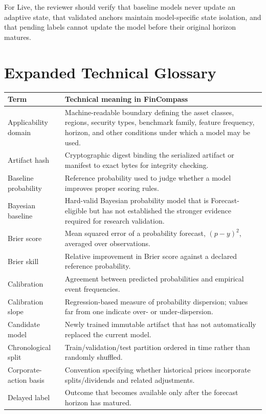 \documentclass[11pt]{article}
\begin{document}
For Live, the reviewer should verify that baseline models never update an adaptive state, that validated anchors maintain model-specific state isolation, and that pending labels cannot update the model before their original horizon matures.

\section{Expanded Technical Glossary}
\begin{longtable}{p{}p{}}
\toprule
Term & Technical meaning in FinCompass\\
\midrule
Applicability domain & Machine-readable boundary defining the asset classes, regions, security types, benchmark family, feature frequency, horizon, and other conditions under which a model may be used.\\
Artifact hash & Cryptographic digest binding the serialized artifact or manifest to exact bytes for integrity checking.\\
Baseline probability & Reference probability used to judge whether a model improves proper scoring rules.\\
Bayesian baseline & Hard-valid Bayesian probability model that is Forecast-eligible but has not established the stronger evidence required for research validation.\\
Brier score & Mean squared error of a probability forecast, $(p-y)^2$, averaged over observations.\\
Brier skill & Relative improvement in Brier score against a declared reference probability.\\
Calibration & Agreement between predicted probabilities and empirical event frequencies.\\
Calibration slope & Regression-based measure of probability dispersion; values far from one indicate over- or under-dispersion.\\
Candidate model & Newly trained immutable artifact that has not automatically replaced the current model.\\
Chronological split & Train/validation/test partition ordered in time rather than randomly shuffled.\\
Corporate-action basis & Convention specifying whether historical prices incorporate splits/dividends and related adjustments.\\
Delayed label & Outcome that becomes available only after the forecast horizon has matured.\\

\end{longtable}
\end{document}
